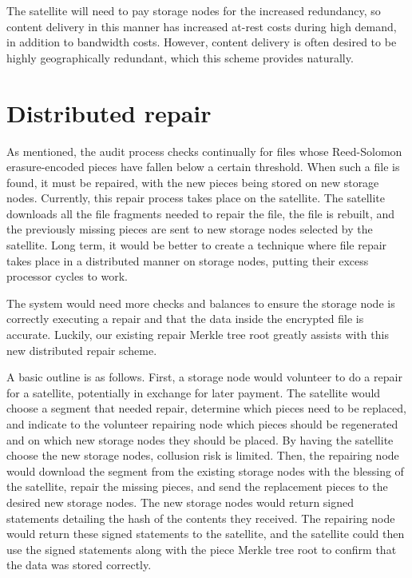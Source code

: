 \documentclass[11pt,fleqn,openany]{book}
\begin{document}
The satellite will need to pay storage nodes for the increased redundancy, so
content delivery in this manner has increased at-rest costs during high
demand, in addition to bandwidth costs. However, content delivery is often
desired to be highly geographically redundant, which this scheme provides
naturally.

\section{Distributed repair}\label{sec:future-distributed-repair}

As mentioned, the audit process checks continually for files whose Reed-Solomon
erasure-encoded pieces have fallen below a certain threshold. When such a file
is found, it must be repaired, with
the new pieces being stored on new storage nodes.
Currently, this
repair process takes place on the satellite. The satellite downloads all
the file fragments needed to repair the file, the file is rebuilt, and the
previously missing pieces are sent to new storage nodes
selected by the satellite.
Long term, it would be better to create a technique where file repair takes
place in a distributed manner on storage nodes, putting their excess processor
cycles to work.

The system would need more checks and balances to ensure the storage node is
correctly
executing a repair and that the data inside the encrypted file is accurate.
Luckily, our existing repair Merkle tree root greatly assists with this
new distributed repair scheme.

A basic outline is as follows. First, a storage node would volunteer to do
a repair for a satellite, potentially in exchange for later payment. The
satellite would choose a segment that needed repair, determine which pieces
need to be replaced, and indicate to the volunteer repairing node which
pieces should be regenerated and on which new storage nodes they should be placed. 
By having the satellite choose the new storage nodes, collusion risk is
limited. Then, the repairing node would download the segment from the existing
storage nodes with the blessing of the satellite, repair the missing pieces,
and send the replacement pieces to the desired new storage nodes. The new
storage nodes would return signed statements detailing the hash of the contents
they received. The repairing node would return these signed statements to the
satellite, and the satellite could then use the signed statements along with
the piece Merkle tree root to confirm that the data was stored correctly.
\end{document}
